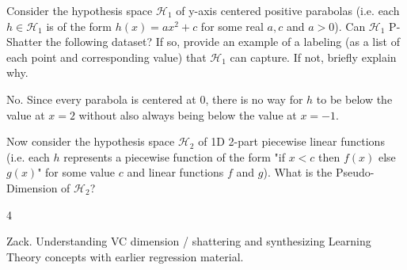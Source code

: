 \begin{parts}
    \begin{subparts}
        \subpart[2] Consider the hypothesis space $\mathcal{H}_1$ of y-axis centered positive parabolas (i.e. each $h \in \mathcal{H}_1$ is of the form $h(x) = ax^2 + c$ for some real $a, c$ and $a > 0$). Can $\mathcal{H}_1$ P-Shatter the following dataset? If so, provide an example of a labeling (as a list of each point and corresponding value) that $\mathcal{H}_1$ can capture. If not, briefly explain why.\\
        \begin{center}
        \end{center}
        \usetikzlibrary{arrows}
    \fillwithlines{4em}
    \begin{soln}
        No. Since every parabola is centered at 0, there is no way for $h$ to be below the value at $x = 2$ without also always being below the value at $x = -1$.
    \end{soln}
    \subpart[2] Now consider the hypothesis space $\mathcal{H}_2$ of 1D 2-part piecewise linear functions (i.e. each $h$ represents a piecewise function of the form "if $x < c$ then $f(x)$ else $g(x)$" for some value $c$ and linear functions $f$ and $g$). What is the Pseudo-Dimension of $\mathcal{H}_2$?
    \begin{checkboxes}
    \end{checkboxes}
    \begin{soln}
        4
    \end{soln}
    \end{subparts}
    \begin{qauthor}
       Zack. Understanding VC dimension / shattering and synthesizing Learning Theory concepts with earlier regression material.
    \end{qauthor}
    
    
    

\end{parts}
